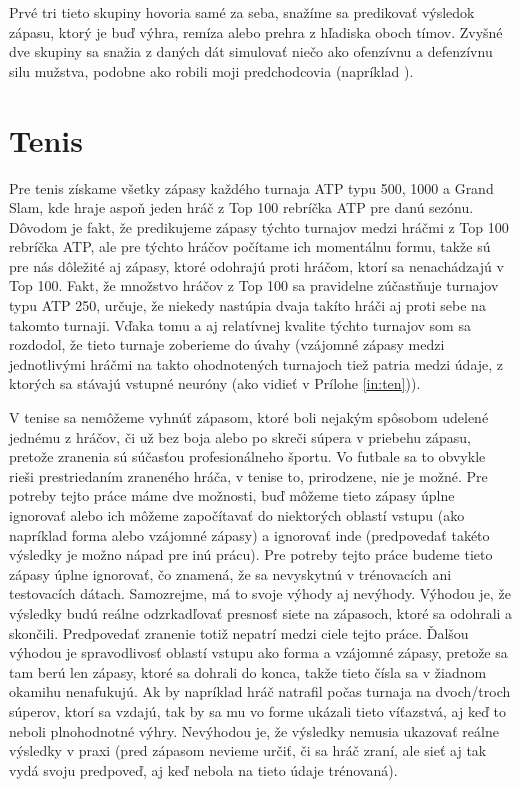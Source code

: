 Prvé tri tieto skupiny hovoria samé za seba, snažíme sa predikovať výsledok zápasu, ktorý je buď výhra, remíza alebo prehra z hľadiska oboch tímov. Zvyšné dve skupiny sa snažia z daných dát simulovať niečo ako ofenzívnu a defenzívnu silu mužstva, podobne ako robili moji predchodcovia (napríklad \citep{related:igiri}).

\section{Tenis} \label{ten}
Pre tenis získame všetky zápasy každého turnaja ATP typu 500, 1000 a Grand Slam, kde hraje aspoň jeden hráč z Top 100 rebríčka ATP pre danú sezónu.
Dôvodom je fakt, že predikujeme zápasy týchto turnajov medzi hráčmi z Top 100 rebríčka ATP, ale pre týchto hráčov počítame ich momentálnu formu, takže sú pre nás dôležité aj zápasy, ktoré odohrajú proti hráčom, ktorí sa nenachádzajú v Top 100.
Fakt, že množstvo hráčov z Top 100 sa pravidelne zúčastňuje turnajov typu ATP 250, určuje, že niekedy nastúpia dvaja takíto hráči aj proti sebe na takomto turnaji. Vďaka tomu a aj relatívnej kvalite týchto turnajov som sa rozdodol, že tieto turnaje zoberieme do úvahy (vzájomné zápasy medzi jednotlivými hráčmi na takto ohodnotených turnajoch tiež patria medzi údaje, z ktorých sa stávajú vstupné neuróny (ako vidieť v Prílohe \ref{in:ten})). 

V tenise sa nemôžeme vyhnúť zápasom, ktoré boli nejakým spôsobom udelené jednému z hráčov, či už bez boja alebo po skreči súpera v priebehu zápasu, pretože zranenia sú súčasťou profesionálneho športu.
Vo futbale sa to obvykle rieši prestriedaním zraneného hráča, v tenise to, prirodzene, nie je možné.
Pre potreby tejto práce máme dve možnosti, buď môžeme tieto zápasy úplne ignorovať alebo ich môžeme započítavať do niektorých oblastí vstupu (ako napríklad forma alebo vzájomné zápasy) a ignorovať inde (predpovedať takéto výsledky je možno nápad pre inú prácu). 
Pre potreby tejto práce budeme tieto zápasy úplne ignorovať, čo znamená, že sa nevyskytnú v trénovacích ani testovacích dátach.
Samozrejme, má to svoje výhody aj nevýhody.
Výhodou je, že výsledky budú reálne odzrkadľovať presnosť siete na zápasoch, ktoré sa odohrali a skončili.
Predpovedať zranenie totiž nepatrí medzi ciele tejto práce.
Ďalšou výhodou je spravodlivosť oblastí vstupu ako forma a vzájomné zápasy, pretože sa tam berú len zápasy, ktoré sa dohrali do konca, takže tieto čísla sa v žiadnom okamihu nenafukujú. Ak by napríklad hráč natrafil počas turnaja na dvoch/troch súperov, ktorí sa vzdajú, tak by sa mu vo forme ukázali tieto víťazstvá, aj keď to neboli plnohodnotné výhry.
Nevýhodou je, že výsledky nemusia ukazovať reálne výsledky v praxi (pred zápasom nevieme určiť, či sa hráč zraní, ale sieť aj tak vydá svoju predpoveď, aj keď nebola na tieto údaje trénovaná).

